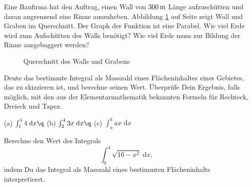 \documentclass[%
11pt,%
twoside,%
titlepage,%
german,%
headsepline%
]{scrartcl}
\begin{document}
\begin{ueb}[Wall]
Eine Baufirma hat den Auftrag, einen Wall von $\unit[300]{m}$ Länge aufzuschütten und daran angrenzend eine Rinne auszuheben. Abbildung \ref{wall} auf Seite \pageref{wall} zeigt Wall und Graben im Querschnitt. Der Graph der Funktion ist eine Parabel. Wie viel Erde wird zum Aufschütten des Walls benötigt? Wie viel Erde muss zur Bildung der Rinne ausgebaggert werden?
\begin{figure}
\begin{center}
\end{center}
\caption{Querschnitt des Walls und Grabens}\label{wall}
\end{figure}
\end{ueb}

\begin{ueb}[geometrisch]
Deute das bestimmte Integral als Masszahl eines Flächeninhaltes eines Gebietes, das zu skizzieren ist, und berechne seinen Wert. Überprüfe Dein Ergebnis, falls möglich, mit den aus der Elementarmathematik bekannten Formeln für Rechteck, Dreieck und Tapez.

(a) $\int_1^54\;\mathrm{d}x\q$ (b) $\int_2^43x\;\mathrm{d}x\q$ (c) $\int_a^bax\;\mathrm{d}x$
\end{ueb}

\begin{ueb}[Kreis]
Berechne den Wert des Integrals
$$\int_0^4\sqrt{16-x^2}\;\mathrm{d}x,$$
indem Du das Integral als Masszahl eines bestimmten Flächeninhalts interpretierst.
\end{ueb}
\end{document}
